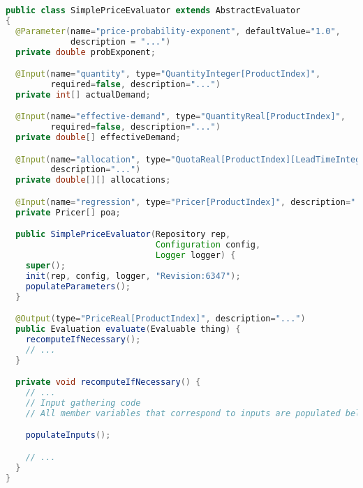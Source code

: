 \documentclass{article}
\begin{document}
{\small
\begin{lstlisting}[language={Java}]
public class SimplePriceEvaluator extends AbstractEvaluator
{
  @Parameter(name="price-probability-exponent", defaultValue="1.0",
             description = "...")
  private double probExponent;

  @Input(name="quantity", type="QuantityInteger[ProductIndex]",
         required=false, description="...")
  private int[] actualDemand;

  @Input(name="effective-demand", type="QuantityReal[ProductIndex]",
         required=false, description="...")
  private double[] effectiveDemand;

  @Input(name="allocation", type="QuotaReal[ProductIndex][LeadTimeInteger]",
         description="...")
  private double[][] allocations;

  @Input(name="regression", type="Pricer[ProductIndex]", description="...")
  private Pricer[] poa;

  public SimplePriceEvaluator(Repository rep,
                              Configuration config,
                              Logger logger) {
    super();
    init(rep, config, logger, "Revision:6347");
    populateParameters();
  }

  @Output(type="PriceReal[ProductIndex]", description="...")
  public Evaluation evaluate(Evaluable thing) {
    recomputeIfNecessary();
    // ...
  }

  private void recomputeIfNecessary() {
    // ...
    // Input gathering code
    // All member variables that correspond to inputs are populated below.

    populateInputs();

    // ...
  }
}
\end{lstlisting}
}
\end{document}
